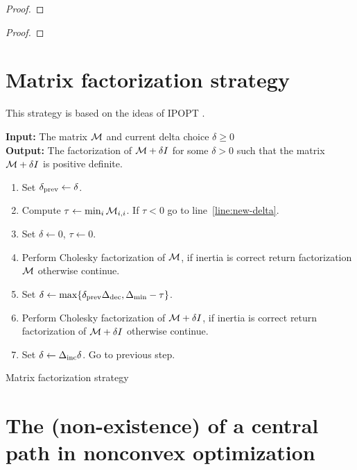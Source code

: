 \documentclass{article}
\begin{document}
\begin{proof}

\end{proof}

\thmSuperlinear*

\begin{proof}

\end{proof}

\fi

\section{Matrix factorization strategy}



This strategy is based on the ideas of IPOPT \cite[Algorithm IC]{wachter2006implementation}.

\begin{algorithm}[H]
\textbf{Input:} The matrix $\mathcal{M}$ and current delta choice $\delta \ge 0$ \\
\textbf{Output:} The factorization of $\mathcal{M} +  \delta I$ for some $\delta > 0$ such that the matrix $\mathcal{M} +  \delta I$ is positive definite.
\begin{enumerate}[label*=A.{\arabic*}]
\item Set $\delta_{\text{prev}} \gets \delta$.
\item Compute $\tau \gets \min_i \mathcal{M}_{i,i}$. If $\tau < 0$ go to line~\ref{line:new-delta}.
\item Set $\delta \gets 0$, $\tau \gets 0$.
\item Perform Cholesky factorization of $\mathcal{M}$, if inertia is correct return factorization $\mathcal{M}$ otherwise continue.
\item\label{line:new-delta} Set $\delta \gets \max\{ \delta_{\text{prev}} \Delta_{\text{dec}}, \Delta_{\min} - \tau \}$.
\item Perform Cholesky factorization of $\mathcal{M} + \delta I$, if inertia is correct return factorization of $\mathcal{M} + \delta I$ otherwise continue.
\item Set $\delta \gets \Delta_{\text{inc}} \delta$. Go to previous step.
\end{enumerate}
\caption{Matrix factorization strategy}\label{alg:mat-fact}
\end{algorithm}

\if{}

\section{The (non-existence) of a central path in nonconvex optimization}\label{app:non-existence-of-central-path}
\end{document}
